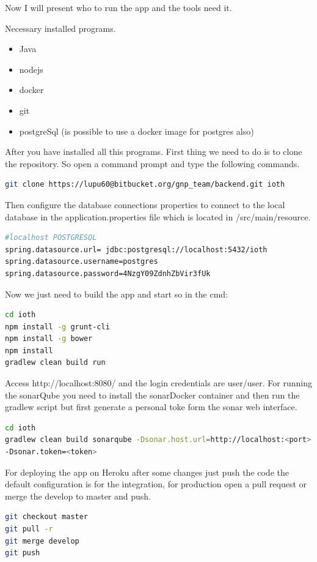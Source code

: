 Now I will present who to run the app and the tools need it.

Necessary installed programs.
\begin{itemize}
	\item Java
	\item nodejs
	\item docker
	\item git
	\item postgreSql (is possible to use a docker image for postgres also)
\end{itemize}
\vspace{5mm}

After you have installed all this programs. First thing we need to do is to clone the repository. So open a command prompt and type the following commands.
\begin{lstlisting}[language=Bash]
git clone https://lupu60@bitbucket.org/gnp_team/backend.git ioth
\end{lstlisting}
\vspace{5mm}

Then configure the database connections properties to connect to the local database in the application.properties file which is located in /src/main/resource.
\begin{lstlisting}[language=Bash]
#localhost POSTGRESQL
spring.datasource.url= jdbc:postgresql://localhost:5432/ioth
spring.datasource.username=postgres
spring.datasource.password=4NzgY09ZdnhZbVir3fUk
\end{lstlisting}
\vspace{5mm}

Now we just need to build the app and start so in the cmd:
\begin{lstlisting}[language=Bash]
cd ioth
npm install -g grunt-cli
npm install -g bower
npm install
gradlew clean build run
\end{lstlisting}
\vspace{5mm}

Access http://localhost:8080/ and the login credentials are user/user. For running the sonarQube you need to install the sonarDocker container and then run the gradlew script but first generate a personal toke form the sonar web interface.
\begin{lstlisting}[language=Bash]
cd ioth
gradlew clean build sonarqube -Dsonar.host.url=http://localhost:<port>
-Dsonar.token=<token>
\end{lstlisting}
\vspace{5mm}

For deploying the app on Heroku after some changes just push the code the default configuration is for the integration, for production open a pull request or merge the develop to master and push.
\begin{lstlisting}[language=Bash]
git checkout master
git pull -r
git merge develop
git push
\end{lstlisting}

